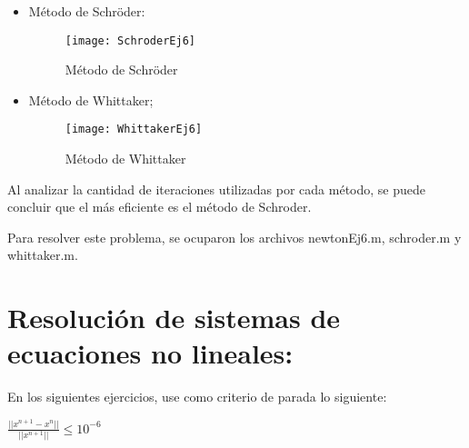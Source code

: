 \documentclass{udpreport}
\begin{document}
\begin{enumerate}
\begin{enumerate}
\begin{itemize}
				\item Método de Schröder: 
				 \begin{figure}[H]
					\centering
					\texttt{[image: SchroderEj6]}
					\caption{Método de Schröder}
				\end{figure}	
				 
				 
				 \item Método de Whittaker;
				 \begin{figure}[H]
					\centering
						\texttt{[image: WhittakerEj6]}
						\caption{Método de Whittaker}
				\end{figure}	
			\end{itemize}
			
			Al analizar la cantidad de iteraciones utilizadas por cada método, se puede concluir que el más eficiente es el método de Schroder.
			
			Para resolver este problema, se ocuparon los archivos newtonEj6.m, schroder.m y whittaker.m.
        \end{enumerate}
\end{enumerate}
\newpage
\chapter{Resolución de sistemas de ecuaciones no lineales:}
    
        
        En los siguientes ejercicios, use como criterio de parada lo siguiente:
        \begin{center}
            $ \frac{|| x^{n+1} - x^{n} ||}{|| x^{n+1} ||} \leq 10^{-6} $  
        \end{center}
        
\end{document}
